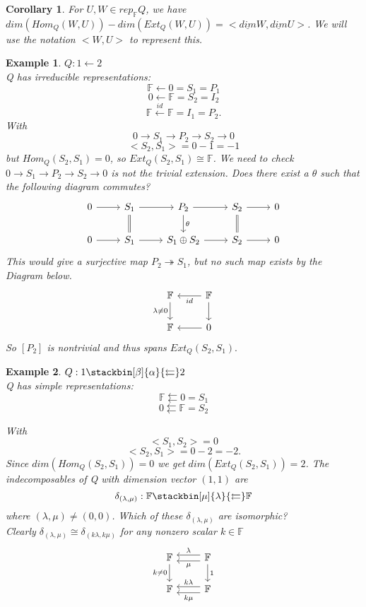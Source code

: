\documentclass{book}
\newtheorem{corollary}[theorem]{Corollary}
\newtheorem{example}{Example}[section]
\begin{document}
		\begin{corollary}
			For $U,W \in rep_\mathbb{F} Q$, we have $dim(Hom_Q(W,U))-dim(Ext_Q(W,U)) = <\underline{dim}W, \underline{dim}U>$.
We will use the notation $<W,U>$ to represent this.
		\end{corollary}

		\begin{example}
			$Q : 1 \leftarrow 2$ \\
			Q has irreducible representations:
			$$\mathbb{F} \leftarrow 0 =S_1=P_1$$
			$$0 \leftarrow \mathbb{F} =S_2=I_2$$
			$$\mathbb{F} \xleftarrow{id} \mathbb{F} = I_1 =P_2.$$
			With
			$$ 0 \rightarrow S_1 \rightarrow P_2 \rightarrow S_2 \rightarrow 0$$
			$$<S_2,S_1>=0-1=-1$$
			but $Hom_Q(S_2,S_1)=0$, so $Ext_Q(S_2,S_1) \cong \mathbb{F}$.
			We need to check $ 0 \rightarrow S_1 \rightarrow P_2 \rightarrow S_2 \rightarrow 0 $ is not the trivial extension.
			Does there exist a $\theta$ such that the following diagram commutes?
			\[ \begin{tikzcd}
			0 \arrow{r} & S_1 \arrow[equal]{d} \arrow{r}& P_2\arrow{r}\arrow{d}{\theta} & S_2  \arrow[equal]{d} \arrow{r} & 0 \\
			0 \arrow{r} & S_1 \arrow{r} & S_1 \oplus S_2 \arrow{r} & S_2 \arrow{r}& 0 
			\end{tikzcd}\]
			This would give a surjective map $P_2 \twoheadrightarrow S_1$, but no such map exists by the Diagram below.
			\[ \begin{tikzcd}
			\mathbb{F} \arrow[d, "\lambda \neq 0" ']&  \arrow{l}{id} \mathbb{F} \arrow{d}  \\
			\mathbb{F}  & \arrow{l} 0
			\end{tikzcd}\]
			So $[P_2]$ is nontrivial and thus spans $Ext_Q(S_2,S_1).$
		\end{example}

		\begin{example}
			$Q : 1 \stackbin[\beta]{\alpha}{\leftleftarrows} 2$ \\
			Q has simple representations:
			$$\mathbb{F} \leftleftarrows 0 =S_1$$
			$$0 \leftleftarrows \mathbb{F} =S_2$$
			
			With
			$$<S_1,S_2>=0$$
			$$<S_2,S_1>=0-2=-2.$$
			Since $dim(Hom_Q(S_2,S_1))=0$ we get $dim(Ext_Q(S_2,S_1)) = 2$.
			The indecomposables of Q with dimension vector $(1,1)$ are $$\delta_{(\lambda,\mu)} : \mathbb{F}  \stackbin[\mu]{\lambda}{\leftleftarrows} \mathbb{F}$$ where ${(\lambda,\mu)} \neq (0,0)$.
			Which of these $\delta_{(\lambda,\mu)}$ are isomorphic?\\
			Clearly $\delta_{(\lambda,\mu)} \cong \delta_{(k\lambda,k\mu)}$ for any nonzero scalar $k\in \mathbb{F}$
			\[ \begin{tikzcd}
			\mathbb{F} \arrow[d, "k \neq 0" '] &  \arrow[l, "\lambda"',yshift=0.7ex] \arrow[l,"\mu",yshift=-0.7ex]  \mathbb{F} \arrow{d}{1}  \\
			\mathbb{F}  &  \arrow[l, "k\lambda"',yshift=0.7ex] \arrow[l,"k\mu",yshift=-0.7ex]  \mathbb{F}
			\end{tikzcd}\]
		\end{example}
\end{document}
